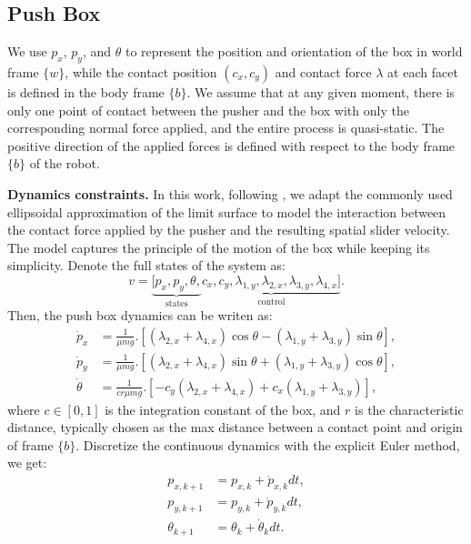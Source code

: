 \subsection{Push Box}\label{app:formulation-pushbox}
We use $p_x$, $p_y$, and $\theta$ to represent the position and orientation of the box in world frame $\{w\}$, while the contact position $(c_x,c_y)$ and contact force $\lambda$ at each facet is defined in the body frame $\{b\}$. We assume that at any given moment, there is only one point of contact between the pusher and the box with only the corresponding normal force applied, and the entire process is quasi-static. The positive direction of the applied forces is defined with respect to the body frame $\{b\}$ of the robot.

\textbf{Dynamics constraints. }
In this work, following \cite{graesdal2024tightconvexrelaxationscontactrich}, we adapt the commonly used ellipsoidal approximation of the limit surface to model the interaction between the contact force applied
by the pusher and the resulting spatial slider velocity. The model captures the principle of the motion of the box while keeping its simplicity.
Denote the full states of the system as: 
$$v = \underbrace{[p_x, p_y, \theta,}_{\text{states}} \underbrace{c_x,c_y,\lambda_{1,y},\lambda_{2,x},\lambda_{3,y}, \lambda_{4,x}]}_{\text{control}}.$$ Then, the push box dynamics can be writen as:
\begin{align}
    \dot{p}_x &= \frac{1}{\mu m g}.\left[(\lambda_{2,x}+\lambda_{4,x})\cos\theta - (\lambda_{1,y} + \lambda_{3,y})\sin\theta\right],\\
\dot{p}_y &= \frac{1}{\mu m g}.\left[(\lambda_{2,x}+\lambda_{4,x})\sin\theta + (\lambda_{1,y} + \lambda_{3,y})\cos\theta\right],\\
\dot{\theta} &= \frac{1}{c r \mu m g}.\left[-c_y(\lambda_{2,x}+\lambda_{4,x}) + c_x(\lambda_{1,y} + \lambda_{3,y})\right],
\end{align}
where $c \in [0,1]$ is the integration constant of the box, and $r$ is the characteristic distance, typically
chosen as the max distance between a contact point and
origin of frame $\{b\}$. Discretize the continuous dynamics with the explicit Euler method, we get:
\begin{align}
    p_{x,k+1} &= p_{x,k} + \dot{p}_{x,k}dt,\\
        p_{y,k+1} &= p_{y,k} + \dot{p}_{y,k}dt,\\    \theta_{k+1} &= \theta_{k} + \dot{\theta}_kdt.
\end{align}

